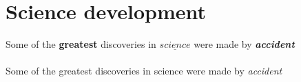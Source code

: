 \documentclass{article}
\begin{document}
 	\section{Science development}
 	Some of the \textbf{greatest}
 	discoveries in $\underline{science}$
 	were made by \textbf{\textit{accident}}
 	
 	\paragraph{}
 	Some of the greatest discoveries in science were made by \emph{accident}
 
\end{document}
